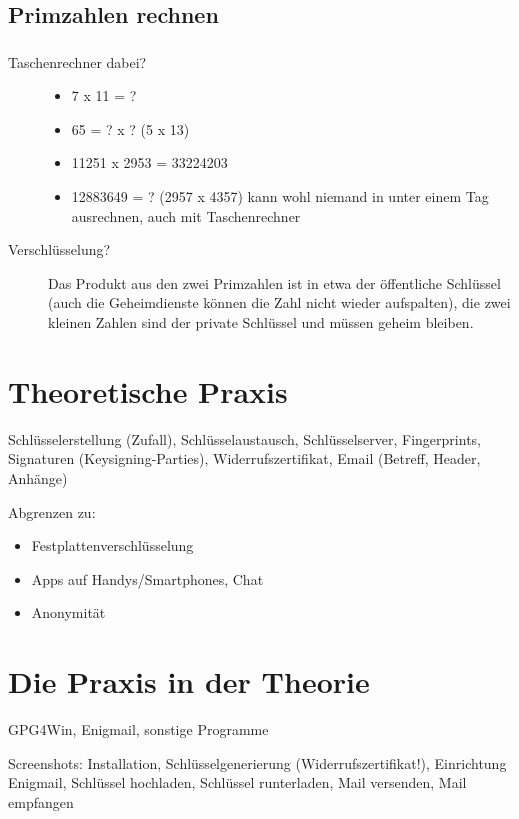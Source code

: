 \documentclass[compress]{beamer}
\begin{document}
\subsection{Primzahlen rechnen}
\begin{frame}
  \frametitle{\insertsubsection}
  \begin{description}
  \item[Taschenrechner dabei?]
    \begin{itemize}
    \item 7 x 11 = ?
    \item 65 = ? x ? (5 x 13)
    \item 11251 x 2953 = 33224203
    \item 12883649 = ? (2957 x 4357) kann wohl niemand in unter einem
      Tag ausrechnen, auch mit Taschenrechner
    \end{itemize}
  \item[Verschlüsselung?] Das Produkt aus den zwei Primzahlen ist in
    etwa der öffentliche Schlüssel (auch die Geheimdienste können die
    Zahl nicht wieder aufspalten), die zwei kleinen Zahlen sind der
    private Schlüssel und müssen geheim bleiben.
  \end{description}
\end{frame}

\section{Theoretische Praxis}
\label{sec-1-1-4}

Schlüsselerstellung (Zufall), Schlüsselaustausch, Schlüsselserver,
Fingerprints, Signaturen (Keysigning-Parties), Widerrufszertifikat,
Email (Betreff, Header, Anhänge)

Abgrenzen zu:
\begin{itemize}
\item Festplattenverschlüsselung
\item Apps auf Handys/Smartphones, Chat
\item Anonymität
\end{itemize}

\section{Die Praxis in der Theorie}
\label{sec:programme}

GPG4Win, Enigmail, sonstige Programme

Screenshots: Installation, Schlüsselgenerierung
(Widerrufszertifikat!), Einrichtung Enigmail, Schlüssel hochladen,
Schlüssel runterladen, Mail versenden, Mail empfangen
\end{document}
